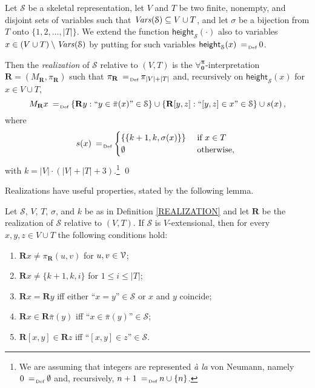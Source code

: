 \documentclass[a4paper,UKenglish]{lipics}
\newcommand{\Lang}{\ensuremath{\mathbf{\forall_{0}^{\pi}}}\xspace}
\newcommand{\nonpairs}[1]{\bar{\pi}(#1)}
\newcommand{\assignment}[1]{\ensuremath{M_{#1}}}
\newcommand{\pairf}[1]{\ensuremath{\pi_{#1}}}
\newcommand{\atset}{\mathcal{S}}
\newcommand{\vheight}{\mathsf{height}_{\atset}}
\newcommand{\aslit}[1]{\mbox{``}#1\mbox{''}}
\newcommand{\real}{\mathbf{R}}
\begin{document}
\begin{definition}[Realization]\label{REALIZATION}
Let $\atset$ be a skeletal representation, let $V$ and $T$ be two
finite, nonempty, and disjoint sets of variables such that
$\Vars(\atset) \subseteq V \cup T$, and let $\sigma$ be a bijection
from $T$ onto $\{1,2,\ldots,|T|\}$.  We extend the function
$\vheight(\cdot)$ also to variables $x \in (V \cup T) \setminus
\Vars(\atset)$ by putting for such variables $\vheight(x) \defAs 0$.

Then the \emph{realization} of $\atset$ relative to $(V,T)$ is
the \Lang-interpretation $\real=(\assignment{\real}, \pairf{\real})$
such that $\pairf{\real} \defAs \pi_{|V|+|T|}$ and, recursively on
$\vheight(x)$ for $x \in V \cup T$,
\[
\assignment{\real} x \defAs \left\{ \real y : \aslit{y \in
\nonpairs{x}} \in \atset\right\} \cup \left\{ \real [y,z] :
\aslit{[y,z] \in x} \in \atset\right\} \cup s(x)\, ,
\]
where
\[
s(x) \defAs  \begin{cases}
\left\{ \left\{k+1, k, \sigma(x)\right\} \right\} & \mbox{ if } x \in T\\
\emptyset &\mbox{ otherwise, }\\
\end{cases}
\]
with $k=|V| \cdot (|V| + |T| + 3)$.\footnote{We are assuming that
integers are represented \emph{\`a la} von Neumann, namely $0 \defAs
\emptyset$ and, recursively, $n+1 \defAs n \cup \{n\}$.} \qed
\end{definition}

Realizations have useful properties, stated by the following
lemma.
\begin{lemma}\label{REALIZATIONLEMMA}
Let $\atset$, $V$, $T$, $\sigma$, and $k$ be as in Definition
\ref{REALIZATION} and let $\real$ be the realization of $\atset$
relative to $(V,T)$.  If $\atset$ is $V$-extensional, then for every
$x,y,z \in V \cup T$ the following conditions hold:
\begin{enumerate}[label=\textbf{(R\arabic*)},leftmargin=28pt]
  \item\label{R1} $\real x \neq \pairf{\real}(u,v)$ for $u,v \in
  \mathcal{V}$;

  \item\label{R2} $\real x \neq \{k+1, k, i\}$ for
  $1 \leq i \leq |T|$;

  \item\label{R3} $\real x = \real y$ iff either $\aslit{x=y}
  \in \atset$ or $x$ and $y$ coincide;

  \item\label{R4} $\real x \in \real \nonpairs{y}$ iff $\aslit{x \in
  \nonpairs{y}} \in \atset$;

  \item\label{R5} $\real [x,y] \in \real z$ iff $\aslit{[x,y] \in z}
  \in \atset$.
\end{enumerate}
\end{lemma}
\end{document}
